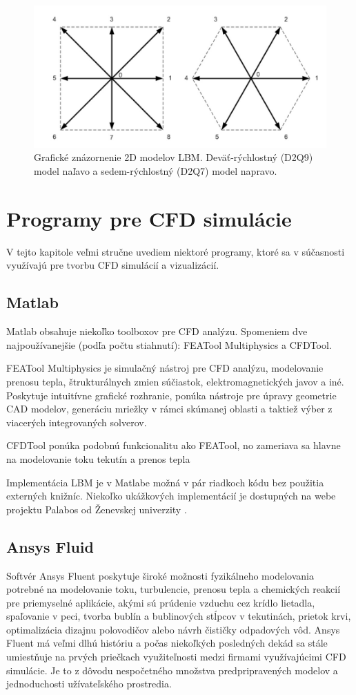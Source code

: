 \documentclass[]{tukediphc}
\begin{document}
\begin{figure}[!ht]
	\centering
	\includegraphics[width=.54\textwidth,angle=0]{figures/lbm-lattices.jpg}
	\caption{Grafické znázornenie 2D modelov LBM. Deväť-rýchlostný (D2Q9) model naľavo a sedem-rýchlostný (D2Q7) model napravo.}
\end{figure}


\section{Programy pre CFD simulácie}

V tejto kapitole veľmi stručne uvediem niektoré programy, ktoré sa v súčasnosti využívajú pre tvorbu CFD simulácií a vizualizácií.

\subsection{Matlab}

Matlab obsahuje niekoľko toolboxov pre CFD analýzu. Spomeniem dve najpoužívanejšie (podľa počtu stiahnutí): FEATool Multiphysics a CFDTool.

FEATool Multiphysics je simulačný nástroj pre CFD analýzu, modelovanie prenosu tepla, štrukturálnych zmien súčiastok, elektromagnetických javov a iné. Poskytuje intuitívne grafické rozhranie, ponúka nástroje pre úpravy geometrie CAD modelov, generáciu mriežky v rámci skúmanej oblasti a taktiež výber z viacerých integrovaných solverov.

CFDTool ponúka podobnú funkcionalitu ako FEATool, no zameriava sa hlavne na modelovanie toku tekutín a prenos tepla

Implementácia LBM je v Matlabe možná v pár riadkoch kódu bez použitia externých knižníc. Niekoľko ukážkových implementácií je dostupných na webe projektu Palabos od Ženevskej univerzity \citep{Palabos2020}.

\subsection{Ansys Fluid}

Softvér Ansys Fluent poskytuje široké možnosti fyzikálneho modelovania potrebné na modelovanie toku, turbulencie, prenosu tepla a chemických reakcií pre priemyselné aplikácie, akými sú prúdenie vzduchu cez krídlo lietadla, spaľovanie v peci, tvorba bublín a bublinových stĺpcov v tekutinách, prietok krvi, optimalizácia dizajnu polovodičov alebo návrh čističky odpadových vôd. Ansys Fluent má veľmi dlhú históriu a počas niekoľkých posledných dekád sa stále umiestňuje na prvých priečkach využiteľnosti medzi firmami využívajúcimi CFD simulácie. Je to z dôvodu nespočetného množstva predpripravených modelov a jednoduchosti užívateľského prostredia.
\end{document}
